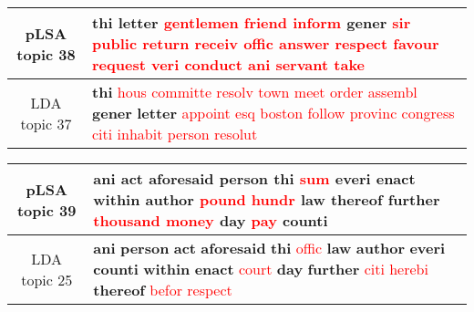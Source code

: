 \begin{center}\begin{tabularx}{\textwidth} {
  | c | >{\raggedright\arraybackslash}X | } \hline 
pLSA topic 38 & \textbf{thi} \textbf{letter} \textcolor{red}{gentlemen} \textcolor{red}{friend} \textcolor{red}{inform} \textbf{gener} \textcolor{red}{sir} \textcolor{red}{public} \textcolor{red}{return} \textcolor{red}{receiv} \textcolor{red}{offic} \textcolor{red}{answer} \textcolor{red}{respect} \textcolor{red}{favour} \textcolor{red}{request} \textcolor{red}{veri} \textcolor{red}{conduct} \textcolor{red}{ani} \textcolor{red}{servant} \textcolor{red}{take} \\ \hline 
LDA topic 37 & \textbf{thi} \textcolor{red}{hous} \textcolor{red}{committe} \textcolor{red}{resolv} \textcolor{red}{town} \textcolor{red}{meet} \textcolor{red}{order} \textcolor{red}{assembl} \textbf{gener} \textbf{letter} \textcolor{red}{appoint} \textcolor{red}{esq} \textcolor{red}{boston} \textcolor{red}{follow} \textcolor{red}{provinc} \textcolor{red}{congress} \textcolor{red}{citi} \textcolor{red}{inhabit} \textcolor{red}{person} \textcolor{red}{resolut} \\ \hline 
\end{tabularx}

\end{center}

\begin{center}\begin{tabularx}{\textwidth} {
  | c | >{\raggedright\arraybackslash}X | } \hline 
pLSA topic 39 & \textbf{ani} \textbf{act} \textbf{aforesaid} \textbf{person} \textbf{thi} \textcolor{red}{sum} \textbf{everi} \textbf{enact} \textbf{within} \textbf{author} \textcolor{red}{pound} \textcolor{red}{hundr} \textbf{law} \textbf{thereof} \textbf{further} \textcolor{red}{thousand} \textcolor{red}{money} \textbf{day} \textcolor{red}{pay} \textbf{counti} \\ \hline 
LDA topic 25 & \textbf{ani} \textbf{person} \textbf{act} \textbf{aforesaid} \textbf{thi} \textcolor{red}{offic} \textbf{law} \textbf{author} \textbf{everi} \textbf{counti} \textbf{within} \textbf{enact} \textcolor{red}{court} \textbf{day} \textbf{further} \textcolor{red}{citi} \textcolor{red}{herebi} \textbf{thereof} \textcolor{red}{befor} \textcolor{red}{respect} \\ \hline 
\end{tabularx}

\end{center}

